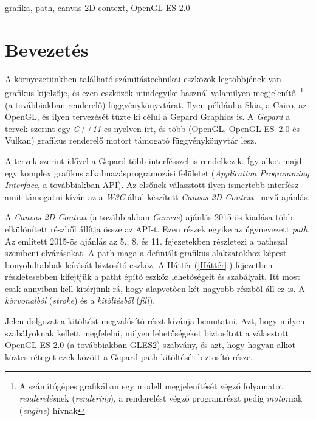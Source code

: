 \documentclass[12pt]{report}
\theoremstyle{definition}
\newcommand{\inenglish}[1]{\textsl{#1}}
\newcommand{\inenglishfn}[1]{\footnotesize{\inenglish{#1}}}
\begin{document}
grafika, path, canvas-2D-context, OpenGL-ES 2.0



    \chapter*{Bevezetés}
    \label{Bevezetés}

  A környezetünkben található számítástechnikai eszközök
legtöbbjének van grafikus kijelzője, és ezen eszközök mindegyike használ
valamilyen megjelenítő~\footnote{A számítógépes grafikában egy modell
megjelenítését végző folyamatot \emph{renderelés}nek (\inenglishfn{rendering}),
a renderelést végző programrészt pedig \emph{motor}nak (\inenglishfn{engine})
hívnak} (a továbbiakban renderelő) függvénykönyvtárat. Ilyen például a Skia, a
Cairo, az OpenGL, és ilyen tervezését tűzte ki célul a Gepard Graphics is. A
\emph{Gepard} a tervek szerint egy \emph{C++11}-es nyelven írt, és több
(OpenGL, \mbox{OpenGL-ES 2.0\cite{Munshi:2008:OEP:1481069}} és Vulkan) grafikus
renderelő motort támogató függvénykönyvtár lesz.

  A tervek szerint idővel a Gepard több interfésszel is rendelkezik.
Így alkot majd egy komplex grafikus alkalmazásprogramozási felületet
(\inenglish{Application Programming Interface}, a továbbiakban API). Az elsőnek
választott ilyen ismertebb interfész amit támogatni kíván az a \emph{W3C} által
készített \emph{Canvas 2D Context}~\cite{Cabanier:14:HCC} nevű ajánlás.

  A \emph{Canvas 2D Context} (a továbbiakban \emph{Canvas}) ajánlás
2015-ös kiadása több elkülönített részből állítja össze az API-t. Ezen részek
egyike az úgynevezett \emph{path}. Az említett 2015-ös ajánlás az 5., 8. és 11.
fejezetekben részletezi a pathszal szembeni elvárásokat. A path maga a
definiált grafikus alakzatokhoz képest bonyolultabbak leírását biztosító
eszköz. A Háttér (\ref{Háttér}.) fejezetben részletesebben kifejtjük a patht
építő eszköz lehetőségeit és szabályait. Itt most csak annyiban kell kitérjünk
rá, hogy alapvetően két nagyobb részből áll ez is. A \emph{körvonalból}
(\inenglish{stroke}) és a \emph{kitöltésből} (\inenglish{fill}).

  Jelen dolgozat a kitöltést megvalósító részt kívánja bemutatni.
Azt, hogy milyen szabályoknak kellett megfelelni, milyen lehetőségeket
biztosított a választott OpenGL-ES 2.0 (a továbbiakban GLES2) szabvány, és azt,
hogy hogyan alkot köztes réteget ezek között a Gepard path kitöltését biztosító
része.
\end{document}
